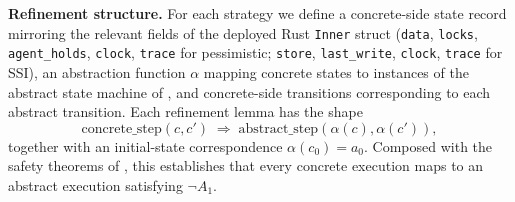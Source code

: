 \documentclass[journal,compsoc,10pt]{IEEEtran}
\theoremstyle{definition}
\theoremstyle{remark}
\begin{document}
\medskip
\noindent\textbf{Refinement structure.}
For each strategy we define a concrete-side state record
mirroring the relevant fields of the deployed Rust
\texttt{Inner} struct (\texttt{data}, \texttt{locks},
\texttt{agent\_holds}, \texttt{clock}, \texttt{trace} for
pessimistic; \texttt{store}, \texttt{last\_write},
\texttt{clock}, \texttt{trace} for SSI), an abstraction function
$\alpha$ mapping concrete states to instances of the abstract
state machine of , and concrete-side
transitions corresponding to each abstract transition. Each
refinement lemma has the shape
\[
  \mathrm{concrete\_step}(c, c') \;\Longrightarrow\;
    \mathrm{abstract\_step}(\alpha(c), \alpha(c')),
\]
together with an initial-state correspondence
$\alpha(c_0) = a_0$. Composed with the safety theorems of
, this establishes that every concrete
execution maps to an abstract execution satisfying $\neg A_1$.
\end{document}
